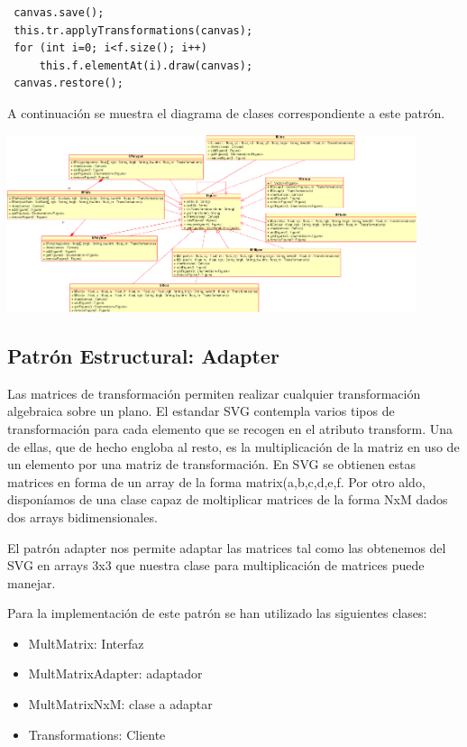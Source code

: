 \documentclass[a4paper,10pt]{article}
\begin{document}
\begin{verbatim}
 canvas.save();
 this.tr.applyTransformations(canvas);
 for (int i=0; i<f.size(); i++)
     this.f.elementAt(i).draw(canvas);
 canvas.restore();
\end{verbatim}

A continuación se muestra el diagrama de clases correspondiente a este patrón.

\begin{center}
 \includegraphics[width=12cm]{composite.png}
\end{center}

\subsection{Patrón Estructural: Adapter}

Las matrices de transformación permiten realizar cualquier transformación algebraica sobre un plano. El estandar SVG contempla varios tipos de transformación para cada elemento que se recogen en el atributo transform. Una de ellas, que de hecho engloba al resto, es la multiplicación de la matriz en uso de un elemento por una matriz de transformación. En SVG se obtienen estas matrices en forma de un array de la forma matrix(a,b,c,d,e,f. Por otro aldo, disponíamos de una clase capaz de moltiplicar matrices de la forma NxM dados dos arrays bidimensionales.

El patrón adapter nos permite adaptar las matrices tal como las obtenemos del SVG en arrays 3x3 que nuestra clase para multiplicación de matrices puede manejar.

Para la implementación de este patrón se han utilizado las siguientes clases:

\begin{itemize}
\item MultMatrix: Interfaz
\item MultMatrixAdapter: adaptador
\item MultMatrixNxM: clase a adaptar
\item Transformations: Cliente                        
\end{itemize}
\end{document}

